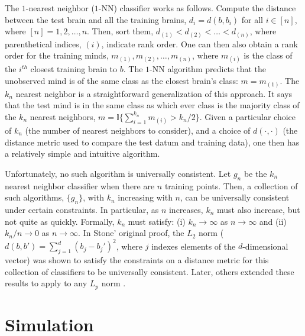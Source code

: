 \documentclass{article}
\newcommand{\conv}{\rightarrow}
\newcommand{\II}{\mathbb{I}}           %
\begin{document}

The $1$-nearest neighbor ($1$-NN) classifier works as follows.  Compute the distance between the test brain and all the training brains, $d_i=d(b,b_i)$ for all $i \in [n]$, where $[n]=1,2,\ldots, n$.  Then, sort them, $d_{(1)} < d_{(2)} < \ldots < d_{(n)}$, where parenthetical indices, $(i)$, indicate rank order.  One can then also obtain a rank order for the training minds, $m_{(1)}, m_{(2)}, \ldots, m_{(n)}$, where $m_{(i)}$ is the class of the $i^{th}$ closest training brain to $b$.  The $1$-NN algorithm predicts that the unobserved mind is of the same class as the closest brain's class: $m=m_{(1)}$.  The $k_n$ nearest neighbor is a straightforward generalization of this approach.  It says that the test mind is in the same class as which ever class is the majority class of the $k_n$ nearest neighbors, $m=\II\{\sum_{i=1}^{k_n} m_{(i)} > k_n/2\}$.  Given a particular choice of $k_n$ (the number of nearest neighbors to consider), and a choice of $d(\cdot,\cdot)$ (the distance metric used to compare the test datum and training data), one then has a relatively simple and intuitive algorithm.  

Unfortunately, no such algorithm is universally consistent.  Let $g_n$ be the $k_n$ nearest neighbor classifier when there are $n$ training points.  Then, a collection of such algorithms, $\{g_n\}$,  with $k_n$ increasing with $n$, can be universally consistent under certain constraints. In particular, as $n$ increases, $k_n$ must also increase, but not quite as quickly.  Formally, $k_n$ must satisfy: (i) $k_n \conv \infty$ as $n \conv \infty$ and (ii) $k_n/n \conv 0$ as $n\conv\infty$. In Stone' original proof, the $L_2$ norm ($d(b,b')=\sum_{j=1}^d (b_j-b_j')^2$, where $j$ indexes elements of the $d$-dimensional vector) was shown to satisfy the constraints on a distance metric for this collection of classifiers to be universally consistent.  Later, others extended these results to apply to any $L_p$ norm \cite{DGL96}.

\section{Simulation} %
\label{sub:simulation}
\end{document}
